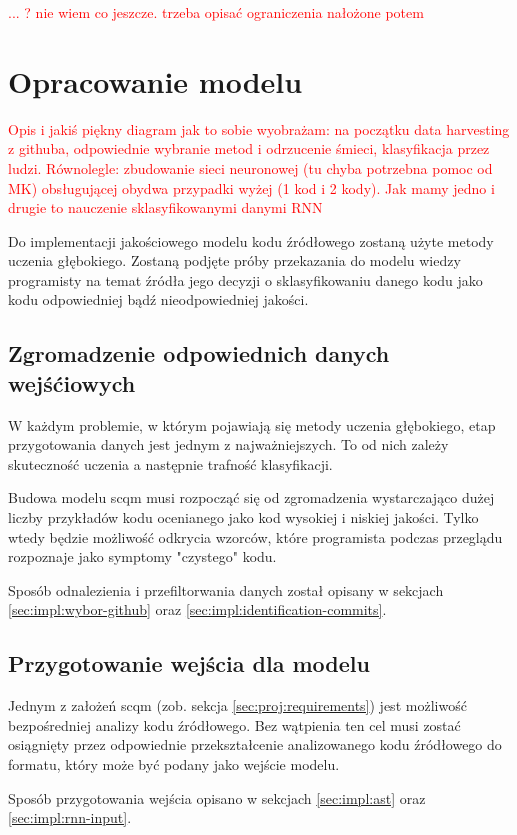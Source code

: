 \documentclass[12pt]{report}
\begin{document}
\textcolor{red}{... ? nie wiem co jeszcze. trzeba opisać ograniczenia nałożone potem}

\section{Opracowanie modelu}
\textcolor{red}{Opis i jakiś piękny diagram jak to sobie wyobrażam: na początku data harvesting z githuba, odpowiednie wybranie metod i odrzucenie śmieci, klasyfikacja przez ludzi. Równolegle: zbudowanie sieci neuronowej (tu chyba potrzebna pomoc od MK) obsługującej obydwa przypadki wyżej (1 kod i 2 kody). Jak mamy jedno i drugie to nauczenie sklasyfikowanymi danymi RNN}

Do implementacji jakościowego modelu kodu źródłowego zostaną użyte metody uczenia głębokiego. Zostaną podjęte próby przekazania do modelu wiedzy programisty na temat źródła jego decyzji o sklasyfikowaniu danego kodu jako kodu odpowiedniej bądź nieodpowiedniej jakości.

\subsection{Zgromadzenie odpowiednich danych wejśćiowych}
W każdym problemie, w którym pojawiają się metody uczenia głębokiego, etap przygotowania danych jest jednym z najważniejszych. To od nich zależy skuteczność uczenia a następnie trafność klasyfikacji.

Budowa modelu \gls{scqm} musi rozpocząć się od zgromadzenia wystarczająco dużej liczby przykładów kodu ocenianego jako kod wysokiej i niskiej jakości. Tylko wtedy będzie możliwość odkrycia wzorców, które programista podczas przeglądu rozpoznaje jako symptomy "czystego" kodu.

Sposób odnalezienia i przefiltorwania danych został opisany w sekcjach \ref{sec:impl:wybor-github} oraz \ref{sec:impl:identification-commits}.

\subsection{Przygotowanie wejścia dla modelu}
Jednym z założeń \gls{scqm} (zob. sekcja \ref{sec:proj:requirements}) jest możliwość bezpośredniej analizy kodu źródłowego. Bez wątpienia ten cel musi zostać osiągnięty przez odpowiednie przekształcenie analizowanego kodu źródłowego do formatu, który może być podany jako wejście modelu.

Sposób przygotowania wejścia opisano w sekcjach \ref{sec:impl:ast} oraz \ref{sec:impl:rnn-input}.
\end{document}
